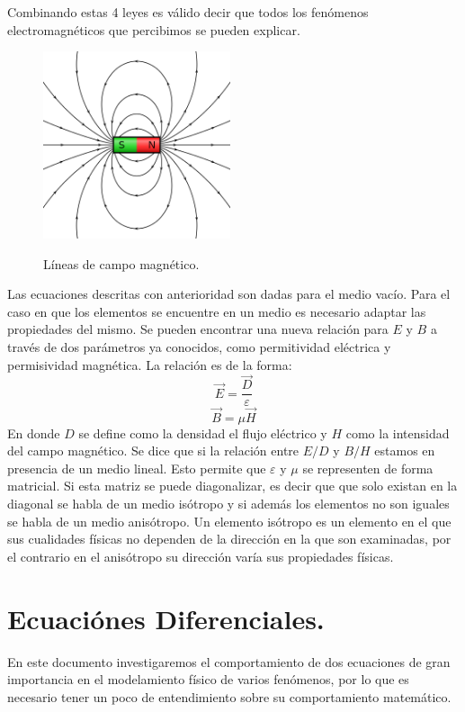 \documentclass[11pt]{article}
\begin{document}
Combinando estas 4 leyes es válido decir que todos los fenómenos electromagnéticos que percibimos se pueden explicar. 
\begin{figure}[H]
\caption{Líneas de campo magnético.}
\centering
\includegraphics[height=5.5cm]{Imagenes/lineasmag.png}\label{fig:Lineas de campo magnetico}
\end{figure}
Las ecuaciones descritas con anterioridad son dadas para el medio vacío. Para el caso en que los elementos se encuentre en un medio es necesario adaptar las propiedades del mismo. Se pueden encontrar una nueva relación para $E$ y $B$ a través de dos parámetros ya conocidos, como permitividad eléctrica y permisividad magnética. La relación es de la forma:
$$\vec{E}=\frac{\vec{D}}{\varepsilon}$$
$$\vec{B}=\mu \vec{H}$$
En donde $D$ se define como la densidad el flujo eléctrico y $H$ como la intensidad del campo magnético. Se dice que si la relación entre  $E/D$ y $B/H$ estamos en presencia de un medio lineal. Esto permite que $\varepsilon$ y $\mu$ se representen de forma matricial. Si esta matriz se puede diagonalizar, es decir que que solo existan en la diagonal se habla de un medio isótropo y si además los elementos no son iguales se habla de un medio anisótropo. Un elemento isótropo es un elemento en el que sus cualidades físicas no dependen de la dirección en la que son examinadas, por el contrario en el anisótropo su dirección varía sus propiedades físicas.
\section{Ecuaciónes Diferenciales.}\label{sec:Ecuaciones Diferenciales.}

En este documento investigaremos el comportamiento de dos ecuaciones de gran importancia en el modelamiento físico de varios fenómenos, por lo que es necesario tener un poco de entendimiento sobre su comportamiento matemático.
\end{document}
